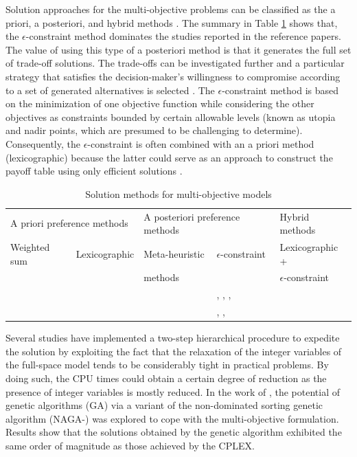 \documentclass[11pt,3p]{elsarticle}
\newcommand{\RomanNumeralCaps}[1]{\MakeUppercase{\romannumeral #1}}
\begin{document}
Solution approaches for the multi-objective problems can be classified as the a priori, a posteriori, and hybrid methods \citep{yann2004multiobjective}. The summary in Table \ref{tab:SolutionMultiObj} shows that, the $\epsilon$-constraint method dominates the studies reported in the reference papers. The value of using this type of a posteriori method is that it generates the full set of trade-off solutions. The trade-offs can be investigated further and a particular strategy that satisfies the decision-maker's willingness to compromise according to a set of generated alternatives is selected \citep{hugo2005hydrogen}. The $\epsilon$-constraint method is based on the minimization of one objective function while considering the other objectives as constraints bounded by certain allowable levels (known as utopia and nadir points, which are presumed to be challenging to determine). Consequently, the $\epsilon$-constraint is often combined with an a priori method (lexicographic) because the latter could serve as an approach to construct the payoff table using only efficient solutions \citep{almaraz2014hydrogen}. 

\begin{table}[!htbp]
\centering
\caption{Solution methods for multi-objective models}
\label{tab:SolutionMultiObj}
\begin{tabular}{lllll}
\hline
\multicolumn{2}{l}{A priori preference methods} & \multicolumn{2}{l}{A posteriori preference methods} & Hybrid methods \\
Weighted sum & Lexicographic & Meta-heuristic & $\epsilon$-constraint & Lexicographic + \\
 &  & methods &  & $\epsilon$-constraint \\ \hline
 &  &  & \citep{almaraz2013assessment}, \citep{almaraz2015deployment}, \citep{guillen2010bi}, & \citep{almaraz2014hydrogen} \\
 &  &  & \citep{kim2008strategic}, \citep{sabio2010strategic}, \citep{sabio2012holistic} &  \\ \hline
\end{tabular}
\end{table}

Several studies \citep{guillen2010bi,sabio2010strategic,agnolucci2013importance,moreno2017towards} have implemented a two-step hierarchical procedure to expedite the solution by exploiting the fact that the relaxation of the integer variables of the full-space model tends to be considerably tight in practical problems. By doing such, the CPU times could obtain a certain degree of reduction as the presence of integer variables is mostly reduced. In the work of \citet{robles2016optimization}, the potential of genetic algorithms (GA) via a variant of the non-dominated sorting genetic algorithm \RomanNumeralCaps 2 (NAGA-\RomanNumeralCaps 2) \citep{deb2002fast} was explored to cope with the multi-objective formulation. Results show that the solutions obtained by the genetic algorithm exhibited the same order of magnitude as those achieved by the CPLEX.
\end{document}
